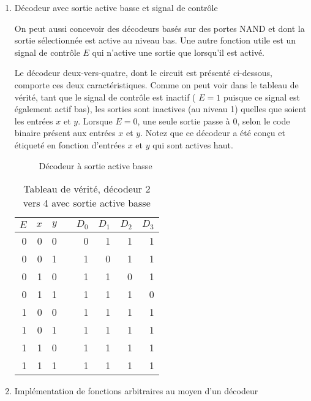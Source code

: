 \documentclass[letter, oneside]{book}
\begin{document}
\begin{enumerate}
\item Décodeur avec sortie active basse et signal de contrôle
\label{sec:orgb020eb8}

On peut aussi concevoir des décodeurs basés sur des portes NAND et
dont la sortie sélectionnée est active au niveau bas. Une autre
fonction utile est un signal de contrôle \(E\) qui n'active une sortie
que lorsqu'il est activé.

Le décodeur deux-vers-quatre, dont le circuit est présenté ci-dessous,
comporte ces deux caractéristiques. Comme on peut voir dans le tableau
de vérité, tant que le signal de contrôle est inactif ( \(E = 1\)
puisque ce signal est également actif bas), les sorties sont inactives
(au niveau 1) quelles que soient les entrées \(x\) et \(y\). Lorsque
\(E = 0\), une seule sortie passe à 0, selon le code binaire présent
aux entrées \(x\) et \(y\). Notez que ce décodeur a été conçu et
étiqueté en fonction d'entrées \(x\) et \(y\) qui sont actives haut.

\begin{figure}[htbp]
\centering

\caption{\label{fig:org04f3279}Décodeur à sortie active basse}
\end{figure}


\begin{table}[htbp]
\caption{\label{tab:org4ef495c}Tableau de vérité, décodeur 2 vers 4 avec sortie active basse}
\centering
\begin{tabular}{rrrlrrrr}
\(E\) & \(x\) & \(y\) &  & \(D_0\) & \(D_1\) & \(D_2\) & \(D_3\)\\[0pt]
\hline
0 & 0 & 0 &  & 0 & 1 & 1 & 1\\[0pt]
0 & 0 & 1 &  & 1 & 0 & 1 & 1\\[0pt]
0 & 1 & 0 &  & 1 & 1 & 0 & 1\\[0pt]
0 & 1 & 1 &  & 1 & 1 & 1 & 0\\[0pt]
1 & 0 & 0 &  & 1 & 1 & 1 & 1\\[0pt]
1 & 0 & 1 &  & 1 & 1 & 1 & 1\\[0pt]
1 & 1 & 0 &  & 1 & 1 & 1 & 1\\[0pt]
1 & 1 & 1 &  & 1 & 1 & 1 & 1\\[0pt]
\end{tabular}
\end{table}


\item Implémentation de fonctions arbitraires au moyen d'un décodeur
\label{sec:org5b93a11}


\end{enumerate}
\end{document}
